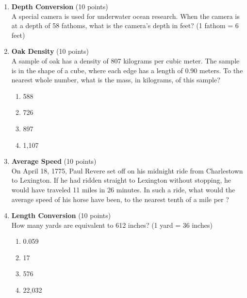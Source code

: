 \begin{enumerate}
  \item \textbf{Depth Conversion} (10 points)\\
  A special camera is used for underwater ocean research. When the camera is at a depth of 58 fathoms, what is the camera's depth in feet? (1 fathom = 6 feet)
  \begin{subanswer}
  \end{subanswer}

  \item \textbf{Oak Density} (10 points)\\
  A sample of oak has a density of 807 kilograms per cubic meter. The sample is in the shape of a cube, where each edge has a length of 0.90 meters. To the nearest whole number, what is the mass, in kilograms, of this sample?
  \begin{enumerate}[label=(\Alph*)]
    \item 588
    \item 726
    \item 897
    \item 1,107
  \end{enumerate}
  \begin{subanswer}
  \end{subanswer}

  \item \textbf{Average Speed} (10 points)\\
  On April 18, 1775, Paul Revere set off on his midnight ride from Charlestown to Lexington. 
  If he had ridden straight to Lexington without stopping, he would have traveled 11 miles 
  in 26 minutes. In such a ride, what would the average speed of his horse have been, to 
  the nearest tenth of a mile per ?
  \begin{subanswer}
  \end{subanswer}

  \newpage

  \item \textbf{Length Conversion} (10 points)\\
  How many yards are equivalent to 612 inches? (1 yard = 36 inches)
  \begin{enumerate}[label=(\Alph*)]
    \item 0.059
    \item 17
    \item 576
    \item 22,032
  \end{enumerate}
  \begin{subanswer}
  \end{subanswer}


\end{enumerate}
